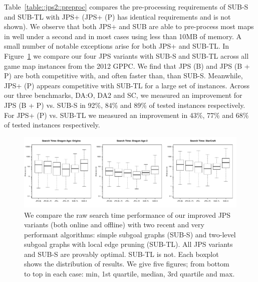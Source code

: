 Table~\ref{table::jps2::preproc} compares the pre-processing requirements of 
SUB-S and SUB-TL with JPS+ (JPS+ (P) has identical requirements and is not shown). 
We observe that both JPS+ and SUB are able to pre-process most maps in well under a second 
and in most cases using less than 10MB of memory. A small number of notable exceptions 
arise for both JPS+ and SUB-TL.
In Figure~\ref{fig::jps2::vs_sub} we compare our four JPS variants with SUB-S and SUB-TL across all
game map instances from the 2012 GPPC. We find that JPS (B) and JPS (B + P) are both
competitive with, and often faster than, than SUB-S. Meanwhile, JPS+ (P) appears competitive 
with SUB-TL for a large set of instances.
Across our three benchmarks, DA:O, DA2 and SC, we measured an improvement for 
JPS (B + P) vs. SUB-S in 92\%, 84\% and 89\% of tested instances respectively.
For JPS+ (P) vs. SUB-TL we measured an improvement in 43\%, 77\% and 68\% of 
tested instances respectively.

\begin{figure} 
\begin{center}
		   \includegraphics[width=\columnwidth, trim = 0mm 0mm 0mm 0mm]
			{chapter_jps2/diagrams/jps_vs_sub_boxplot.pdf}
       \end{center}
\caption[Search time performance: JPS+ vs. SUB] 
{\small
We compare the raw search time performance of our improved JPS variants (both
online and offline) with two recent and very performant algorithms: simple
subgoal graphs (SUB-S) and two-level subgoal graphs with local edge pruning
(SUB-TL). All JPS variants and SUB-S are provably optimal. SUB-TL is not.
Each boxplot shows the distribution of results.  We give five figures; from
bottom to top in each case: min, 1st quartile, median, 3rd quartile and max.
}
\label{fig::jps2::vs_sub}
\end{figure}

